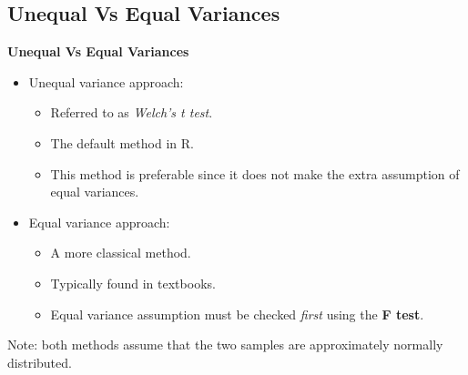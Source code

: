 \documentclass[compress]{beamer}        %
\makeatletter
\newcommand{\tcb}{\textcolor{beamer@blendedblue}}
\makeatother
\begin{document}
\subsection{Unequal Vs Equal Variances}
\begin{frame}{\bf \tcb{Unequal Vs Equal Variances}}


\begin{itemize}\itemsep0.5cm
\item Unequal variance approach:\\[0.1cm]
\begin{itemize}\itemsep0.2cm
\item Referred to as \emph{Welch's t test}.
\item The default method in R.
\item This method is preferable since it does not make the extra assumption of equal variances.
\end{itemize}
\item Equal variance approach:\\[0.1cm]
\begin{itemize}\itemsep0.2cm
\item A more classical method.
\item Typically found in textbooks.
\item Equal variance assumption must be checked \emph{first} using the {\bf F test}.\\[0.5cm]
\end{itemize}
\end{itemize}

Note: both methods assume that the two samples are approximately normally distributed.

\end{frame}
\end{document}
